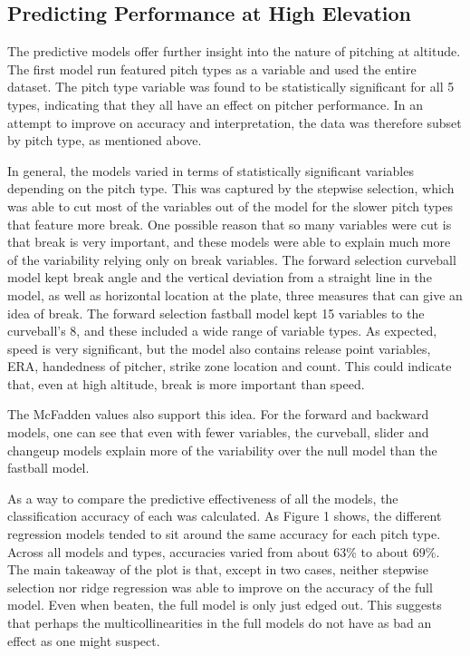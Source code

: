 \documentclass{article}
\begin{document}
\subsection{Predicting Performance at High Elevation}

The predictive models offer further insight into the nature of pitching at altitude. The first model run featured pitch types as a variable and used the entire dataset. The pitch type variable was found to be statistically significant for all 5 types, indicating that they all have an effect on pitcher performance. In an attempt to improve on accuracy and interpretation, the data was therefore subset by pitch type, as mentioned above. 

In general, the models varied in terms of statistically significant variables depending on the pitch type. This was captured by the stepwise selection, which was able to cut most of the variables out of the model for the slower pitch types that feature more break. One possible reason that so many variables were cut is that break is very important, and these models were able to explain much more of the variability relying only on break variables. The forward selection curveball model kept break angle and the vertical deviation from a straight line in the model, as well as horizontal location at the plate, three measures that can give an idea of break. The forward selection fastball model kept 15 variables to the curveball’s 8, and these included a wide range of variable types. As expected, speed is very significant, but the model also contains release point variables, ERA, handedness of pitcher, strike zone location and count. This could indicate that, even at high altitude, break is more important than speed. 

The McFadden values also support this idea. For the forward and backward models, one can see that even with fewer variables, the curveball, slider and changeup models explain more of the variability over the null model than the fastball model. 

As a way to compare the predictive effectiveness of all the models, the classification accuracy of each was calculated. As Figure 1 shows, the different regression models tended to sit around the same accuracy for each pitch type.  Across all models and types, accuracies varied from about 63\% to about 69\%. The main takeaway of the plot is that, except in two cases, neither stepwise selection nor ridge regression was able to improve on the accuracy of the full model. Even when beaten, the full model is only just edged out. This suggests that perhaps the multicollinearities in the full models do not have as bad an effect as one might suspect. 
\end{document}
